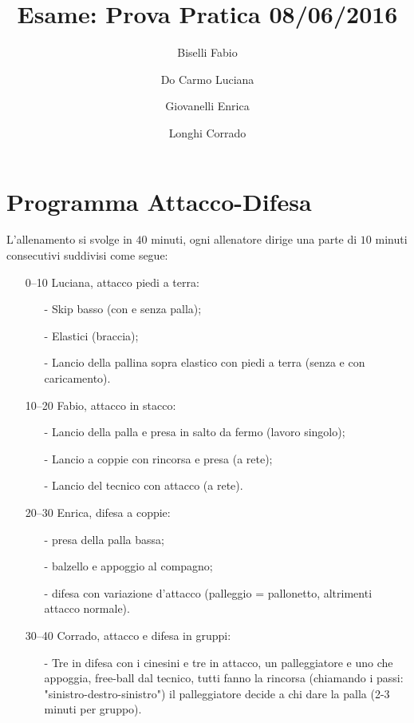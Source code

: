 \documentclass[a4paper, 12pt]{article}
\title{Esame: Prova Pratica 08/06/2016}
\author{
Biselli Fabio
\and
Do Carmo Luciana
\and
Giovanelli Enrica
\and
Longhi Corrado
}
\date {}
\theoremstyle{remark}
\begin{document}
\maketitle

\section*{Programma Attacco-Difesa}
L'allenamento si svolge in $40$ minuti, ogni allenatore dirige una parte di $10$ minuti consecutivi
suddivisi come segue:
\begin{itemize}
\item [0--10] Luciana, attacco piedi a terra:
  \begin{itemize}
  \item[-]Skip basso (con e senza palla);
  \item[-]Elastici (braccia);
  \item[-]Lancio della pallina sopra elastico con piedi a terra (senza e con caricamento).
  \end{itemize}
\item [10--20] Fabio, attacco in stacco:
  \begin{itemize}
  \item[-]Lancio della palla e presa in salto da fermo (lavoro singolo);
  \item[-]Lancio a coppie con rincorsa e presa (a rete);
  \item[-]Lancio del tecnico con attacco (a rete).
  \end{itemize}
\item [20--30] Enrica, difesa a coppie:
  \begin{itemize}
  \item[-]presa della palla bassa;
  \item[-]balzello e appoggio al compagno;
  \item[-]difesa con variazione d'attacco (palleggio = pallonetto, altrimenti attacco normale).
  \end{itemize}
\item [30--40] Corrado, attacco e difesa in gruppi:
  \begin{itemize}
  \item[-]Tre in difesa con i cinesini e tre in attacco, un palleggiatore e uno che appoggia,
  free-ball dal tecnico, tutti fanno la rincorsa (chiamando i passi: "sinistro-destro-sinistro") il
  palleggiatore decide a chi dare la palla (2-3 minuti per gruppo).
  \end{itemize}
\end{itemize}
\end{document}
